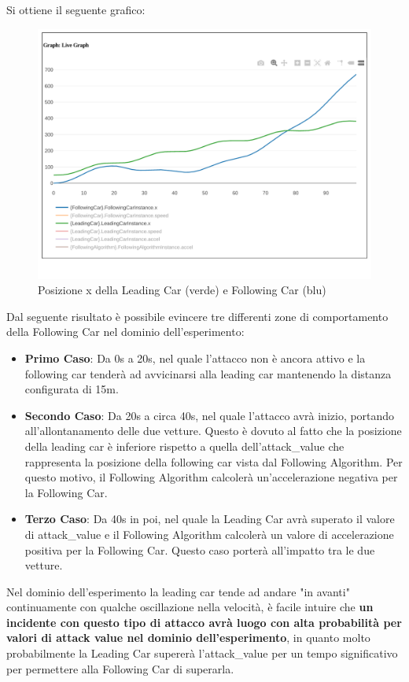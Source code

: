 Si ottiene il seguente grafico:
\begin{figure}[H]
	\centering
	\includegraphics[width=\textwidth]{img/AttackXSimulation.png}
	\caption{Posizione x della Leading Car (verde) e Following Car (blu)}
\end{figure}
Dal seguente risultato è possibile evincere tre differenti zone di comportamento della Following Car nel dominio dell'esperimento: 
\begin{itemize}
	\item \textbf{Primo Caso}: Da 0s a 20s, nel quale l'attacco non è ancora attivo e la following car tenderà ad avvicinarsi alla leading car mantenendo la distanza configurata di 15m.
	\item \textbf{Secondo Caso}: Da 20s a circa 40s, nel quale l'attacco avrà inizio, portando all'allontanamento delle due vetture. Questo è dovuto al fatto che la posizione della leading car è inferiore rispetto a quella dell'attack\_value che rappresenta la posizione della following car vista dal Following Algorithm. Per questo motivo, il Following Algorithm calcolerà un'accelerazione negativa per la Following Car.
	\item \textbf{Terzo Caso}: Da 40s in poi, nel quale la Leading Car avrà superato il valore di attack\_value e il Following Algorithm calcolerà un valore di accelerazione positiva per la Following Car. Questo caso porterà all'impatto tra le due vetture.
\end{itemize}

Nel dominio dell'esperimento la leading car tende ad andare "in avanti" continuamente con qualche oscillazione nella velocità, è facile intuire che \textbf{un incidente con questo tipo di attacco avrà luogo con alta probabilità per valori di attack value nel dominio dell'esperimento}, in quanto molto probabilmente la Leading Car supererà l'attack\_value per un tempo significativo per permettere alla Following Car di superarla.
  
